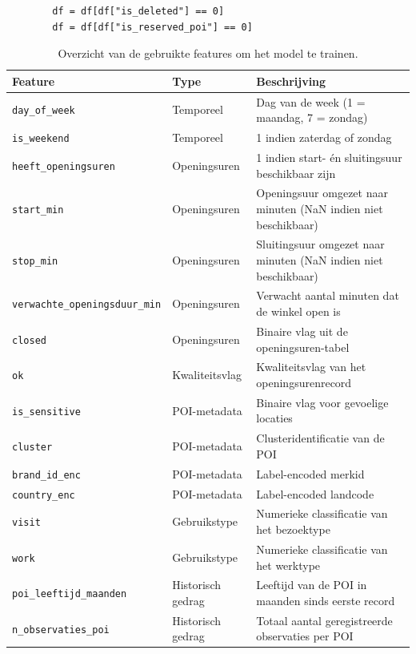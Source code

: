 \begin{listing}[H]
    \begin{verbatim}
        df = df[df["is_deleted"] == 0]
        df = df[df["is_reserved_poi"] == 0]
    \end{verbatim}
    \caption[Filtering records]{Verwijdering van records met \texttt{is\_deleted = 1} en \texttt{is\_reserved\_poi = 1} 
        uit de dataset.}
\end{listing}

\begin{table}[H]
    \centering
    \small
    \begin{tabular}{lll}
        \toprule
        \textbf{Feature} & \textbf{Type} & \textbf{Beschrijving} \\
        \midrule
        \texttt{day\_of\_week} & Temporeel & Dag van de week (1 = maandag, 7 = zondag) \\
        \texttt{is\_weekend} & Temporeel &  1 indien zaterdag of zondag \\
        \texttt{heeft\_openingsuren} & Openingsuren &  1 indien start- én sluitingsuur beschikbaar zijn \\
        \texttt{start\_min} & Openingsuren & Openingsuur omgezet naar minuten (NaN indien niet beschikbaar) \\
        \texttt{stop\_min}  & Openingsuren & Sluitingsuur omgezet naar minuten (NaN indien niet beschikbaar) \\
        \texttt{verwachte\_openingsduur\_min} & Openingsuren & Verwacht aantal minuten dat de winkel open is \\
        \texttt{closed} & Openingsuren & Binaire vlag uit de openingsuren-tabel \\
        \texttt{ok} & Kwaliteitsvlag & Kwaliteitsvlag van het openingsurenrecord \\
        \texttt{is\_sensitive} & POI-metadata & Binaire vlag voor gevoelige locaties \\
        \texttt{cluster} & POI-metadata & Clusteridentificatie van de POI \\
        \texttt{brand\_id\_enc} & POI-metadata & Label-encoded merkid \\
        \texttt{country\_enc} & POI-metadata & Label-encoded landcode \\
        \texttt{visit} & Gebruikstype & Numerieke classificatie van het bezoektype \\ 
        \texttt{work} & Gebruikstype & Numerieke classificatie van het werktype \\
        \texttt{poi\_leeftijd\_maanden} & Historisch gedrag & Leeftijd van de POI in maanden sinds eerste record \\
        \texttt{n\_observaties\_poi} & Historisch gedrag & Totaal aantal geregistreerde observaties per POI \\
        \bottomrule
    \end{tabular}
    \caption[Overzicht van gebruikte features]{%
        \label{tab:features}Overzicht van de gebruikte features om het model te trainen.}
\end{table}

